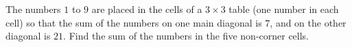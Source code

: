 The numbers $1$ to $9$ are placed in the cells of a $3\times3$ table (one number in each cell) so that the sum of the numbers on one main diagonal is $7$, and on the other diagonal is $21$. Find the sum of the numbers in the five non-corner cells.
